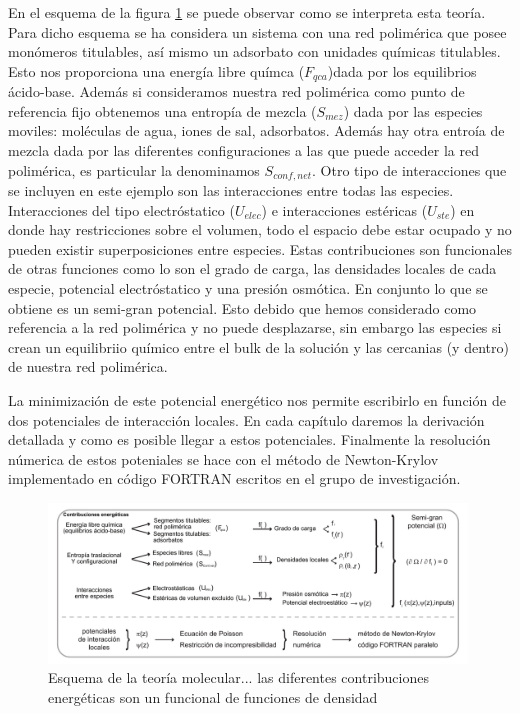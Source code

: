 En el esquema de la figura \ref{fig:met:tm_esquema} se puede observar como se interpreta esta teor\'ia. Para dicho esquema se ha considera un sistema con una red polim\'erica que posee mon\'omeros titulables, as\'i mismo un adsorbato con unidades qu\'imicas titulables. Esto nos proporciona una energ\'ia libre qu\'imca ($F_{qca}$)dada por los equilibrios \'acido-base.
Adem\'as si consideramos nuestra red polim\'erica como punto de referencia fijo obtenemos una entrop\'ia de mezcla ($S_{mez}$) dada por las especies moviles: mol\'eculas de agua, iones de sal, adsorbatos. Adem\'as hay otra entro\'ia de mezcla dada por las diferentes configuraciones a las que puede acceder la red polim\'erica, es particular la denominamos $S_{conf,net}$.
Otro tipo de interacciones que se incluyen en este ejemplo son las interacciones entre todas las especies. Interacciones del tipo electr\'ostatico ($U_{elec}$) e interacciones est\'ericas ($U_{ste}$) en donde hay restricciones sobre el volumen, todo el espacio debe estar ocupado y no pueden existir superposiciones entre especies. 
Estas contribuciones son funcionales de otras funciones como lo son el grado de carga, las densidades locales de cada especie, potencial electr\'ostatico y una presi\'on osm\'otica. En conjunto lo que se obtiene es un semi-gran potencial. Esto debido que hemos considerado como referencia a la red polim\'erica y no puede desplazarse, sin embargo las especies si crean un equilibriio qu\'imico entre el bulk de la soluci\'on y las cercanias (y dentro) de nuestra red polim\'erica.

La minimizaci\'on de este potencial energ\'etico nos permite escribirlo en funci\'on de dos potenciales de interacci\'on locales. En cada cap\'itulo daremos la derivaci\'on detallada y como es posible llegar a estos potenciales. 
Finalmente la resoluci\'on n\'umerica de estos poteniales se hace con el m\'etodo de Newton-Krylov \addcite[newton-k] implementado en c\'odigo FORTRAN escritos en el grupo de investigaci\'on.
 \begin{figure}[!htb]
	\centering
	\includegraphics[width=0.99\textwidth]{Figures/TM.pdf}
	\caption{Esquema de la teor\'ia molecular... las diferentes contribuciones energ\'eticas son un funcional de funciones de densidad}
	\label{fig:met:tm_esquema}
\end{figure}


